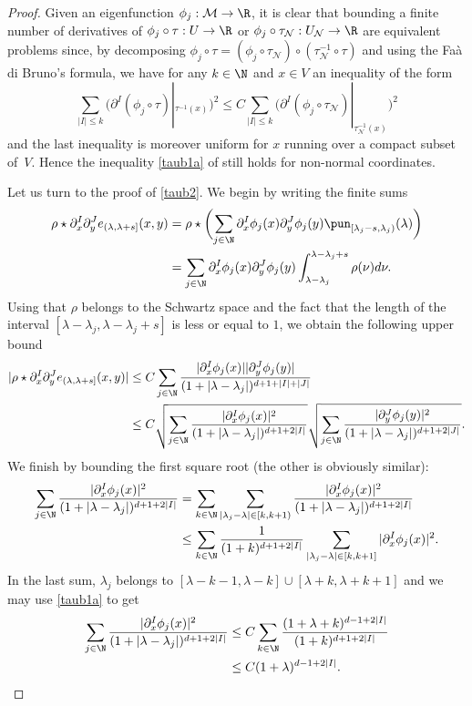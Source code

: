 \begin{proof}
Given an eigenfunction \hbox{$\phi_j:\mathcal{M}\to \R$}, it is clear that bounding a finite number of derivatives of $\phi_j\circ \tau:U\to \R$ or $\phi_j\circ \tau_{\mathcal{N}}:U_{\mathcal{N}}\to \R$ are equivalent problems since, by decomposing $\phi_j\circ \tau=(\phi_j\circ \tau_{\mathcal{N}})\circ (\tau_{\mathcal{N}}^{-1}\circ \tau)$ and using the Faà di Bruno's formula, we have for any $k\in \N$ and $x\in V$ an inequality of the form
\begin{equation*}
\sum_{|I|\leq k} \bigl(\partial^I (\phi_j\circ \tau)|_{\tau^{-1}(x)}\bigr)^2 \leq C
\sum_{|I| \leq k} \bigl(\partial^I (\phi_j\circ \tau_{\mathcal{N}})|_{\tau_{\mathcal{N}}^{-1}(x)}\bigr)^2
\end{equation*}
and the last inequality is moreover uniform for $x$ running over a compact subset of~$V$.
Hence the inequality \eqref{taub1a} of \cite{bin2004} still holds for non-normal coordinates.

Let us turn to the proof of \eqref{taub2}. We begin by writing the finite sums
\begin{align*}
\rho \star \partial_x^I \partial_y^J e_{(\lambda,\lambda+s]}(x,y) & = \rho \star \biggl(\sum_{j\in \N} \partial_x^I \phi_j(x) \partial_y^J \phi_j (y) \pun_{[\lambda_j-s,\lambda_j)}(\lambda) \biggr)\\
& = \sum_{j\in \N} \partial_x^I \phi_j(x)\partial_y^J\phi_j(y) \int_{\lambda-\lambda_j}^{\lambda-\lambda_j+s} \rho(\nu)d\nu .
\end{align*}
Using that $\rho$ belongs to the Schwartz space and the fact that the length of the interval $[\lambda-\lambda_j,\lambda-\lambda_j+s]$ is less or equal to $1$, we obtain the following upper bound
\begin{align*}
|\rho \star \partial_x^I \partial_y^J e_{(\lambda,\lambda+s]}(x,y)| & \leq  C\sum_{j\in \N} \frac{|\partial_x^{I} \phi_j(x)||\partial_y^J \phi_j(y)|}{(1+|\lambda-\lambda_j|)^{d+1+|I|+|J|}}\\
& \leq C \sqrt{\sum_{j\in \N} \frac{|\partial_x^{I} \phi_j(x)|^2}{(1+|\lambda-\lambda_j|)^{d+1+2|I|}}}
\sqrt{\sum_{j\in \N} \frac{|\partial_y^{J} \phi_j(y)|^2}{(1+|\lambda-\lambda_j|)^{d+1+
2|J|}}}.
\end{align*}
We finish by bounding the first square root (the other is obviously similar):
\begin{align*}
\sum_{j\in \N} \frac{|\partial_x^{I} \phi_j(x)|^2}{(1+|\lambda-\lambda_j|)^{d+1+2|I|}} &=
\sum_{k\in \N} \sum_{|\lambda_j-\lambda|\in [k,k+1)} \frac{|\partial_x^{I} \phi_j(x)|^2}{(1+|\lambda-\lambda_j|)^{d+1+2|I|}} \\
& \leq \sum_{k\in \N}\frac{1}{(1+k)^{d+1+2|I|}} \sum_{|\lambda_j-\lambda|\in [k,k+1]}|\partial_x^{I} \phi_j(x)|^2.
\end{align*}
In the last sum, $\lambda_j$ belongs to $[\lambda-k-1,\lambda-k]\cup[\lambda+k,\lambda+k+1]$ and we may use \eqref{taub1a} to get
\begin{align*}
\sum_{j\in \N} \frac{|\partial_x^{I} \phi_j(x)|^2}{(1+|\lambda-\lambda_j|)^{d+1+2|I|}} &\leq C \sum_{k\in \N}\frac{(1+\lambda+k)^{d-1+2|I|}}{(1+k)^{d+1+2|I|}}\\
& \leq C (1+\lambda)^{d-1+2|I|}.\qedhere
\end{align*}
\end{proof}

